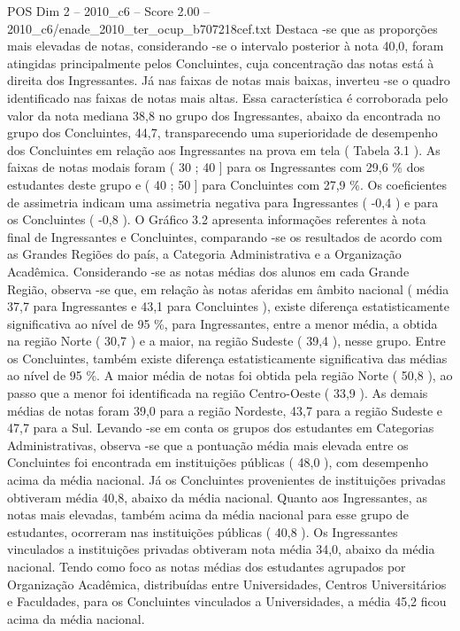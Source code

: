 \begin{textsample}{POS Dim 2 – 2010\_c6 – Score 2.00 – 2010\_c6/enade\_2010\_ter\_ocup\_b707218cef.txt}
Destaca -se que as proporções mais elevadas de notas, considerando -se o intervalo posterior à nota 40,0, foram atingidas principalmente pelos Concluintes, cuja concentração das notas está à direita dos Ingressantes.
Já nas faixas de notas mais baixas, inverteu -se o quadro identificado nas faixas de notas mais altas.
Essa característica é corroborada pelo valor da nota mediana 38,8 no grupo dos Ingressantes, abaixo da encontrada no grupo dos Concluintes, 44,7, transparecendo uma superioridade de desempenho dos Concluintes em relação aos Ingressantes na prova em tela ( Tabela 3.1 ).
As faixas de notas modais foram ( 30 ; 40 ] para os Ingressantes com 29,6 \% dos estudantes deste grupo e ( 40 ; 50 ] para Concluintes com 27,9 \%.
Os coeficientes de assimetria indicam uma assimetria negativa para Ingressantes ( -0,4 ) e para os Concluintes ( -0,8 ).
O Gráfico 3.2 apresenta informações referentes à nota final de Ingressantes e Concluintes, comparando -se os resultados de acordo com as Grandes Regiões do país, a Categoria Administrativa e a Organização Acadêmica.
Considerando -se as notas médias dos alunos em cada Grande Região, observa -se que, em relação às notas aferidas em âmbito nacional ( média 37,7 para Ingressantes e 43,1 para Concluintes ), existe diferença estatisticamente significativa ao nível de 95 \%, para Ingressantes, entre a menor média, a obtida na região Norte ( 30,7 ) e a maior, na região Sudeste ( 39,4 ), nesse grupo.
Entre os Concluintes, também existe diferença estatisticamente significativa das médias ao nível de 95 \%.
A maior média de notas foi obtida pela região Norte ( 50,8 ), ao passo que a menor foi identificada na região Centro-Oeste ( 33,9 ).
As demais médias de notas foram 39,0 para a região Nordeste, 43,7 para a região Sudeste e 47,7 para a Sul.
Levando -se em conta os grupos dos estudantes em Categorias Administrativas, observa -se que a pontuação média mais elevada entre os Concluintes foi encontrada em instituições públicas ( 48,0 ), com desempenho acima da média nacional.
Já os Concluintes provenientes de instituições privadas obtiveram média 40,8, abaixo da média nacional.
Quanto aos Ingressantes, as notas mais elevadas, também acima da média nacional para esse grupo de estudantes, ocorreram nas instituições públicas ( 40,8 ).
Os Ingressantes vinculados a instituições privadas obtiveram nota média 34,0, abaixo da média nacional.
Tendo como foco as notas médias dos estudantes agrupados por Organização Acadêmica, distribuídas entre Universidades, Centros Universitários e Faculdades, para os Concluintes vinculados a Universidades, a média 45,2 ficou acima da média nacional.

\end{textsample}
